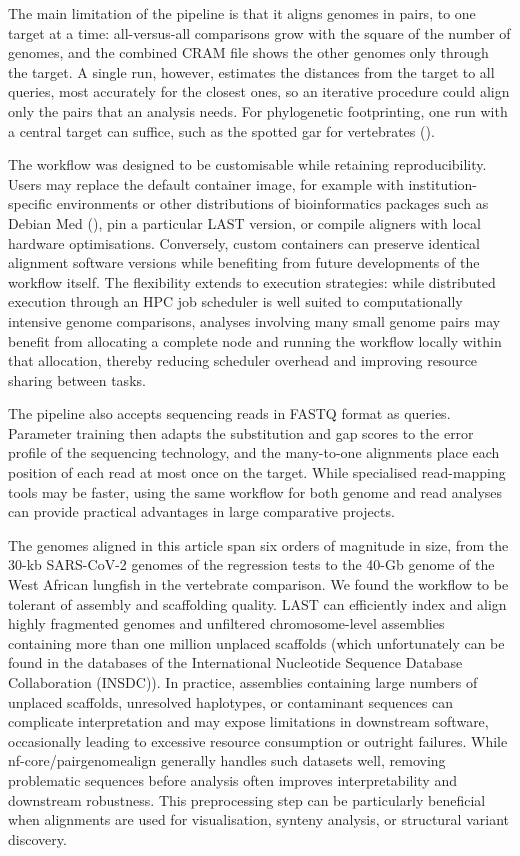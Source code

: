 \documentclass[PCJ,Unicode,screen]{cedram}
\begin{document}
The main limitation of the pipeline is that it aligns genomes in pairs, to one target at a time: all-versus-all comparisons grow with the square of the number of genomes, and the combined CRAM file shows the other genomes only through the target. A single run, however, estimates the distances from the target to all queries, most accurately for the closest ones, so an iterative procedure could align only the pairs that an analysis needs. For phylogenetic footprinting, one run with a central target can suffice, such as the spotted gar for vertebrates (\cite{Braasch_2016}).

The workflow was designed to be customisable while retaining reproducibility. Users may replace the default container image, for example with institution-specific environments or other distributions of bioinformatics packages such as Debian Med (\cite{Moeller_2010}), pin a particular LAST version, or compile aligners with local hardware optimisations. Conversely, custom containers can preserve identical alignment software versions while benefiting from future developments of the workflow itself. The flexibility extends to execution strategies: while distributed execution through an HPC job scheduler is well suited to computationally intensive genome comparisons, analyses involving many small genome pairs may benefit from allocating a complete node and running the workflow locally within that allocation, thereby reducing scheduler overhead and improving resource sharing between tasks.

The pipeline also accepts sequencing reads in FASTQ format as queries. Parameter training then adapts the substitution and gap scores to the error profile of the sequencing technology, and the many-to-one alignments place each position of each read at most once on the target. While specialised read-mapping tools may be faster, using the same workflow for both genome and read analyses can provide practical advantages in large comparative projects.

The genomes aligned in this article span six orders of magnitude in size, from the 30-kb SARS-CoV-2 genomes of the regression tests to the 40-Gb genome of the West African lungfish in the vertebrate comparison. We found the workflow to be tolerant of assembly and scaffolding quality. LAST can efficiently index and align highly fragmented genomes and unfiltered chromosome-level assemblies containing more than one million unplaced scaffolds (which unfortunately can be found in the databases of the International Nucleotide Sequence Database Collaboration (INSDC)). In practice, assemblies containing large numbers of unplaced scaffolds, unresolved haplotypes, or contaminant sequences can complicate interpretation and may expose limitations in downstream software, occasionally leading to excessive resource consumption or outright failures. While nf-core/pairgenomealign generally handles such datasets well, removing problematic sequences before analysis often improves interpretability and downstream robustness. This preprocessing step can be particularly beneficial when alignments are used for visualisation, synteny analysis, or structural variant discovery.
\end{document}
